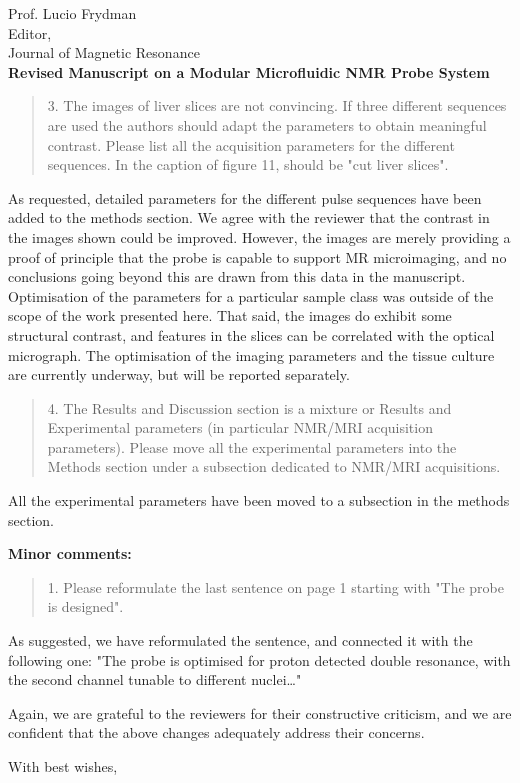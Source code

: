 \documentclass{mu-soton-letter}
\newenvironment{reviewer} {\begin{quote}\color{black!50}} {\end{quote}}
\begin{document}
\begin{letter}{Prof. Lucio Frydman\\
  Editor,\\
  Journal of Magnetic Resonance\\[2cm]
  \textbf{Revised Manuscript on a Modular Microfluidic NMR Probe System}}
\begin{reviewer}
3.      The images of liver slices are not convincing.  If three different sequences are used the authors should adapt the parameters to obtain meaningful contrast. Please list all the acquisition parameters for the different sequences. In the caption of figure 11, should be "cut liver slices".
\end{reviewer}
As requested, detailed parameters for the different pulse
sequences have been added to the methods section.
We agree with the reviewer that the contrast in the images shown could be
improved. However,
the images are merely providing a proof
of principle that the probe is capable to support MR microimaging, and no
conclusions going beyond this are drawn from this data in the manuscript.
Optimisation of the parameters for a particular sample class was outside of the
scope of the work presented here. That said, the images do exhibit some
structural contrast, and features in the slices can be correlated with the
optical micrograph. The optimisation of the imaging parameters and the
tissue culture are currently underway, but will be reported separately.

\clearpage
\begin{reviewer}
4.      The Results and Discussion section is a mixture or Results and Experimental parameters (in particular NMR/MRI acquisition parameters). Please move all the experimental parameters into the Methods section under a subsection dedicated to NMR/MRI acquisitions.
\end{reviewer}
All the experimental parameters have been moved to a subsection in the methods section.

\textcolor{black!50}{ \textbf{Minor comments:}}
\begin{reviewer}
1.      Please reformulate the last sentence on page 1 starting with "The probe is designed".
\end{reviewer}
As suggested, we have reformulated the sentence, and connected it with the following one:
"The probe is optimised for proton detected double resonance, with the
second channel tunable to different nuclei\ldots"
\vspace{3cm}

Again, we are grateful to the reviewers for their constructive criticism, and
we are confident that the above changes adequately address their concerns.


\closing{With best wishes,}

\end{letter}
\end{document}
